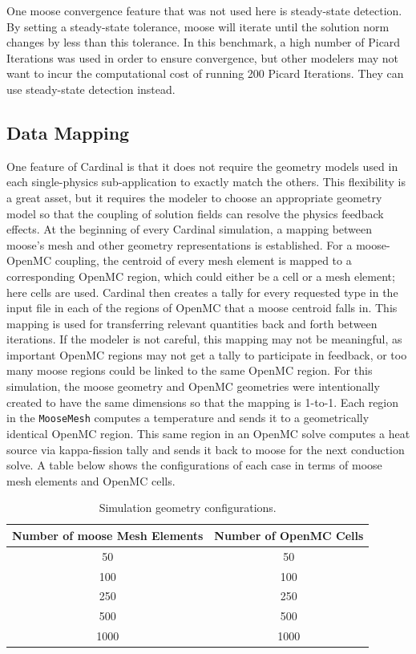 \documentclass[letterpaper]{mc2023}
\begin{document}
One \gls{moose} convergence feature that was not used here is steady-state detection. By setting a steady-state tolerance, \gls{moose}
will iterate until the solution norm changes by less than this tolerance. In this benchmark, a high number of Picard Iterations was used
in order to ensure convergence, but other modelers may not want to incur the computational cost of running 200 Picard Iterations. They can
use steady-state detection instead.

\subsection{Data Mapping}
One feature of Cardinal is that it does not require the geometry models used in each single-physics sub-application to exactly match the 
others. This flexibility is a great asset, but it requires the modeler to choose an appropriate geometry model so that the coupling of
solution fields can resolve the physics feedback effects. At the beginning of every Cardinal simulation, a mapping between \gls{moose}'s mesh
and other geometry representations is established. For a \gls{moose}-OpenMC coupling, the centroid of every mesh element is mapped to
a corresponding OpenMC region, which could either be a cell or a mesh element; here cells are used. Cardinal then creates a tally for every
requested type in the input file in each of the regions of OpenMC that a \gls{moose} centroid falls in. This mapping is used for transferring
relevant quantities back and forth between iterations. If the modeler is not careful, this mapping may not be meaningful, as important OpenMC
regions may not get a tally to participate in feedback, or too many \gls{moose} regions could be linked to the same OpenMC region. For this
simulation, the \gls{moose} geometry and OpenMC geometries were intentionally created to have the same dimensions so that the mapping is 
1-to-1. Each region in the \texttt{MooseMesh} computes a temperature and sends it to a geometrically identical OpenMC region. This same
region in an OpenMC solve computes a heat source via kappa-fission tally and sends it back to \gls{moose} for the next conduction solve.
A table below shows the configurations of each case in terms of \gls{moose} mesh elements and OpenMC cells.
\begin{table}[b]
    \centering
    \caption{Simulation geometry configurations.}
    \begin{tabular}{@{}cc@{}}
        \toprule
            Number of \gls{moose} Mesh Elements & Number of OpenMC Cells \\
        \midrule
            50 & 50 \\
            100 & 100 \\
            250 & 250 \\
            500 & 500 \\ 
            1000 & 1000 \\
        \bottomrule
    \end{tabular}
\end{table}
\end{document}
